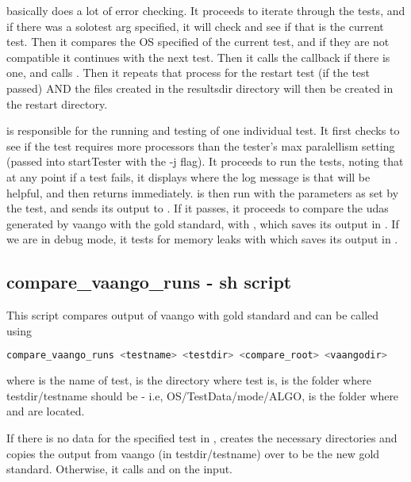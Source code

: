  basically does a lot of error checking.
It proceeds to iterate through the tests, and if there was a solotest arg
specified, it will check and see if that is the current test.  
Then it compares the OS specified of the current test, and if they are not 
compatible it continues with the next test.  Then it calls the callback if 
there is one, and calls .  Then it repeats that process for the 
restart test (if the \Vaango test passed) AND the files created in the resultsdir
directory will then be created in the restart directory.

 is responsible for the running and testing of one individual test.
It first checks to see if the test requires more processors than the tester's
max paralellism setting (passed into startTester with the -j flag).  It 
proceeds to run the tests, noting that at any point if a test fails, it 
displays where the log message is that will be helpful, and then returns
immediately.  \Vaango is then run with the parameters as set by the test, and 
sends its output to .  If it passes, it proceeds to compare the udas
generated by vaango with the gold standard, with , which saves
its output in .  If we are in debug mode, it tests 
for memory leaks with  which saves its output in 
.

\subsection{compare\_vaango\_runs - sh script}
This script compares output of vaango with gold standard and can be called using
\begin{lstlisting}[language=sh, backgroundcolor=\color{background}]
  compare_vaango_runs <testname> <testdir> <compare_root> <vaangodir>
\end{lstlisting}
where  is the name of test,  is the
directory where test is,  is the folder where testdir/testname 
should be - i.e, OS/TestData/mode/ALGO,  is the folder where 
 and  are located.

If there is no data for the specified test in , 
creates the necessary directories and copies the output from vaango (in 
testdir/testname) over to be the new gold standard.  Otherwise, it calls
 and  on the input.

